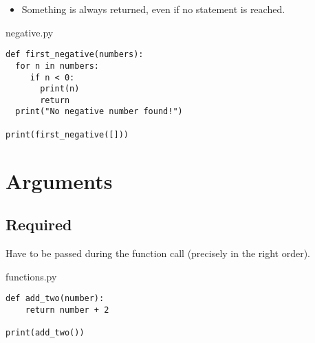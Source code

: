 \documentclass[aspectratio=1610,slidestop]{beamer}
\begin{document}
\begin{pframe}
 \begin{itemize}
  \item Something is always returned, even if no  statement is reached.
 \end{itemize}
 \medskip

 \begin{minipage}[t]{0.52\textwidth}
  \begin{pythonfile}{negative.py}
   \begin{verbatim}
def first_negative(numbers):
  for n in numbers:
     if n < 0:
       print(n)
       return
  print("No negative number found!")

print(first_negative([]))
   \end{verbatim}
  \end{pythonfile}
 \end{minipage}\qquad
 \pause
 \begin{minipage}[t]{0.42\textwidth}
 \vspace{-4.15cm}
 \begin{terminal}
 \end{terminal}
 \end{minipage}
\end{pframe}



\section{Arguments}

\subsection{Required}
\begin{pframe}
  Have to be passed during the function call (precisely in the right order).
 \begin{pythonfile}{functions.py}
  \begin{verbatim}
def add_two(number):
    return number + 2

print(add_two())
  \end{verbatim}
 \end{pythonfile}
 \pause
 \begin{terminal}
 \end{terminal}
\end{pframe}
\end{document}
